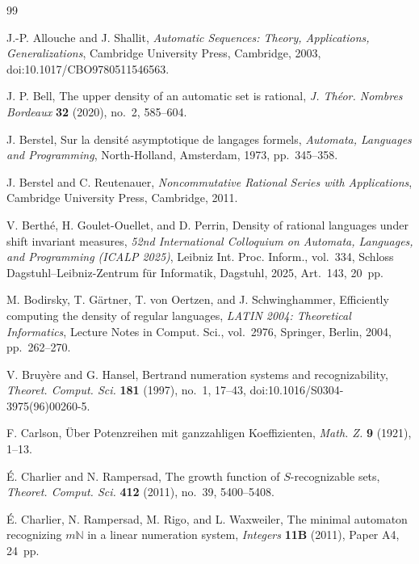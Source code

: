 \begin{thebibliography}{99}

J.-P. Allouche and J. Shallit,
\textit{Automatic Sequences: Theory, Applications, Generalizations},
Cambridge University Press, Cambridge, 2003,
doi:10.1017/CBO9780511546563.

J. P. Bell,
The upper density of an automatic set is rational,
\textit{J. Th{\'e}or. Nombres Bordeaux} \textbf{32} (2020), no.~2, 585--604.

J. Berstel,
Sur la densit\'e asymptotique de langages formels,
\textit{Automata, Languages and Programming},
North-Holland, Amsterdam, 1973, pp.~345--358.

J. Berstel and C. Reutenauer,
\textit{Noncommutative Rational Series with Applications},
Cambridge University Press, Cambridge, 2011.

V. Berth{\'e}, H. Goulet-Ouellet, and D. Perrin,
Density of rational languages under shift invariant measures,
\textit{52nd International Colloquium on Automata, Languages, and Programming
(ICALP 2025)}, Leibniz Int. Proc. Inform., vol.~334,
Schloss Dagstuhl--Leibniz-Zentrum f\"ur Informatik, Dagstuhl, 2025,
Art.~143, 20~pp.

M. Bodirsky, T. G\"artner, T. von Oertzen, and J. Schwinghammer,
Efficiently computing the density of regular languages,
\textit{LATIN 2004: Theoretical Informatics}, Lecture Notes in Comput.
Sci., vol.~2976, Springer, Berlin, 2004, pp.~262--270.

V. Bruy{\`e}re and G. Hansel,
Bertrand numeration systems and recognizability,
\textit{Theoret. Comput. Sci.} \textbf{181} (1997), no.~1, 17--43,
doi:10.1016/S0304-3975(96)00260-5.

F. Carlson,
{\"U}ber Potenzreihen mit ganzzahligen Koeffizienten,
\textit{Math. Z.} \textbf{9} (1921), 1--13.

\'E. Charlier and N. Rampersad,
The growth function of \(S\)-recognizable sets,
\textit{Theoret. Comput. Sci.} \textbf{412} (2011), no.~39, 5400--5408.

\'E. Charlier, N. Rampersad, M. Rigo, and L. Waxweiler,
The minimal automaton recognizing \(m\mathbb{N}\) in a linear numeration
system,
\textit{Integers} \textbf{11B} (2011), Paper A4, 24~pp.


\end{thebibliography}

